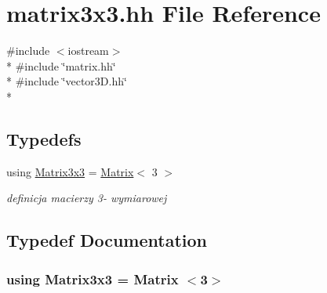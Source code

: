 \hypertarget{matrix3x3_8hh}{}\section{matrix3x3.\+hh File Reference}
\label{matrix3x3_8hh}
{\ttfamily \#include $<$iostream$>$}\\*
{\ttfamily \#include \char`\"{}matrix.\+hh\char`\"{}}\\*
{\ttfamily \#include \char`\"{}vector3\+D.\+hh\char`\"{}}\\*
\subsection*{Typedefs}
\begin{DoxyCompactItemize}
\item 
using \hyperlink{matrix3x3_8hh_ae0d6db325717593a1d1157ecfa156f13}{Matrix3x3} = \hyperlink{class_matrix}{Matrix}$<$ 3 $>$
\begin{DoxyCompactList}\small\item\em definicja macierzy 3-\/ wymiarowej \end{DoxyCompactList}\end{DoxyCompactItemize}


\subsection{Typedef Documentation}
\subsubsection[{\texorpdfstring{Matrix3x3}{Matrix3x3}}]{\setlength{\rightskip}{0pt plus 5cm}using {\bf Matrix3x3} =  {\bf Matrix} $<$3$>$}\hypertarget{matrix3x3_8hh_ae0d6db325717593a1d1157ecfa156f13}{}\label{matrix3x3_8hh_ae0d6db325717593a1d1157ecfa156f13}
